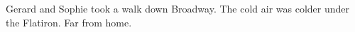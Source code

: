 

Gerard and Sophie took a walk down Broadway.  The cold air was colder
under the Flatiron.  Far from home.

\bye
